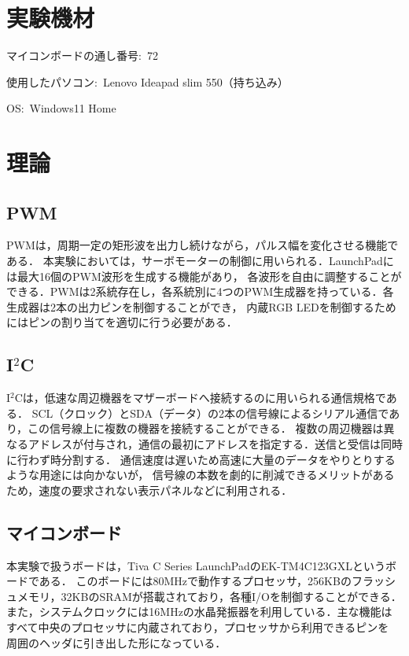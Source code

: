 \documentclass{jlreq}
\begin{document}
\tableofcontents
\clearpage

\section{実験機材}

マイコンボードの通し番号:\ 72

使用したパソコン:\ Lenovo Ideapad slim 550（持ち込み）

OS:\ Windows11 Home

\section{理論}

\subsection{PWM}
PWMは，周期一定の矩形波を出力し続けながら，パルス幅を変化させる機能である．
本実験においては，サーボモーターの制御に用いられる．LaunchPadには最大16個のPWM波形を生成する機能があり，
各波形を自由に調整することができる．PWMは2系統存在し，各系統別に4つのPWM生成器を持っている．各生成器は2本の出力ピンを制御することができ，
内蔵RGB LEDを制御するためにはピンの割り当てを適切に行う必要がある．

\subsection{I$^2$C}
I$^2$Cは，低速な周辺機器をマザーボードへ接続するのに用いられる通信規格である．
SCL（クロック）とSDA（データ）の2本の信号線によるシリアル通信であり，この信号線上に複数の機器を接続することができる．
複数の周辺機器は異なるアドレスが付与され，通信の最初にアドレスを指定する．送信と受信は同時に行わず時分割する．
通信速度は遅いため高速に大量のデータをやりとりするような用途には向かないが，
信号線の本数を劇的に削減できるメリットがあるため，速度の要求されない表示パネルなどに利用される．

\subsection{マイコンボード}
本実験で扱うボードは，Tiva C Series LaunchPadのEK-TM4C123GXLというボードである．
このボードには80MHzで動作するプロセッサ，256KBのフラッシュメモリ，32KBのSRAMが搭載されており，各種I/Oを制御することができる．
また，システムクロックには16MHzの水晶発振器を利用している．主な機能はすべて中央のプロセッサに内蔵されており，プロセッサから利用できるピンを
周囲のヘッダに引き出した形になっている．
\end{document}
